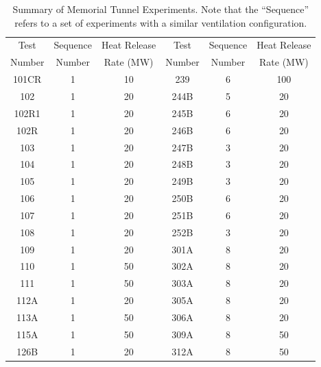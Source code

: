 \begin{table}[p]
\centering
\caption[Summary of Memorial Tunnel Experiments]{Summary of Memorial Tunnel Experiments. Note that the ``Sequence'' refers to a set of experiments with a similar ventilation configuration. }
\begin{tabular}{|c|c|c||c|c|c|}
\hline
Test    & Sequence & Heat Release     & Test    & Sequence & Heat Release  \\
Number  & Number   & Rate (MW)        & Number  & Number   & Rate (MW)     \\ \hline \hline
101CR   &   1      &  10              & 239     &   6      & 100           \\ \hline
102     &   1      &  20              & 244B    &   5      &  20           \\ \hline
102R1   &   1      &  20              & 245B    &   6      &  20           \\ \hline
102R    &   1      &  20              & 246B    &   6      &  20           \\ \hline
103     &   1      &  20              & 247B    &   3      &  20           \\ \hline
104     &   1      &  20              & 248B    &   3      &  20           \\ \hline
105     &   1      &  20              & 249B    &   3      &  20           \\ \hline
106     &   1      &  20              & 250B    &   6      &  20           \\ \hline
107     &   1      &  20              & 251B    &   6      &  20           \\ \hline
108     &   1      &  20              & 252B    &   3      &  20           \\ \hline
109     &   1      &  20              & 301A    &   8      &  20           \\ \hline
110     &   1      &  50              & 302A    &   8      &  20           \\ \hline
111     &   1      &  50              & 303A    &   8      &  20           \\ \hline
112A    &   1      &  20              & 305A    &   8      &  20           \\ \hline
113A    &   1      &  50              & 306A    &   8      &  20           \\ \hline
115A    &   1      &  50              & 309A    &   8      &  50           \\ \hline
126B    &   1      &  20              & 312A    &   8      &  50           \\ \hline

\end{tabular}
\end{table}

